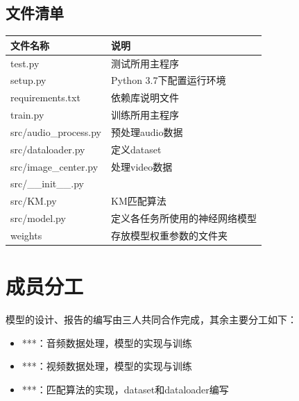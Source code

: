 \documentclass[a4paper]{ctexart}
\begin{document}
\subsection{文件清单}

\begin{table}[H]
    \centering
    \begin{tabular}{ll}
        \toprule
        文件名称         & 说明                       \\
        \midrule
        test.py          & 测试所用主程序  \\
        setup.py         & Python 3.7下配置运行环境  \\
        requirements.txt & 依赖库说明文件                   \\
        train.py     & 训练所用主程序  \\
        src/audio\_process.py     & 预处理audio数据  \\
        src/dataloader.py     & 定义dataset  \\
        src/image\_center.py     & 处理video数据  \\
        src/\_\_init\_\_.py       \\
        src/KM.py     & KM匹配算法  \\
        src/model.py     & 定义各任务所使用的神经网络模型  \\
        weights     & 存放模型权重参数的文件夹 \\

        \bottomrule
    \end{tabular}
\end{table}

\section{成员分工}
模型的设计、报告的编写由三人共同合作完成，其余主要分工如下：
\begin{itemize}
    \item ***：音频数据处理，模型的实现与训练
    \item ***：视频数据处理，模型的实现与训练
    \item ***：匹配算法的实现，dataset和dataloader编写
\end{itemize}
 

\end{document}
